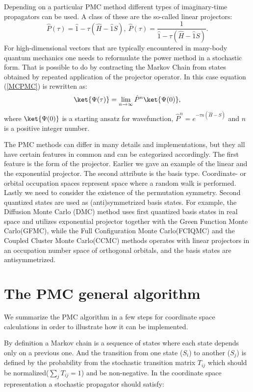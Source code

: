 \documentclass[twoside,english]{uiofysmaster}
\begin{document}
Depending on a particular PMC method different types of imaginary-time propagators can be used. A class of these  are the so-called linear projectors:
\[
\hat{P}(\tau)= \hat{1} - \tau (\hat{H} - \hat{1}S),\ 
\hat{P}(\tau)= \frac {1}{\hat{1} - \tau (\hat{H} - \hat{1}S)}.
\]
For high-dimensional vectors that are typically encountered in many-body quantum mechanics one needs to reformulate the power method in a stochastic form. That is possible to do by contracting the Markov Chain from states obtained by repeated application of the projector operator. In this case equation (\ref{MCPMC}) is rewritten as:
\begin{equation}\label{MCPMC1}
\ket{\Psi(\tau)}= \lim_{n\to\infty} \hat{P}^n \ket{\Psi(0)}, 
\end{equation}
where $\ket{\Psi(0)}$ is a starting ansatz for wavefunction, $\hat{P}^n = e^{-\tau n(\hat{H} - S)}$ and $n$ is a positive integer number.

The PMC methods can differ in many details and implementations, but
they all have certain features in common and can be categorized
accordingly. The first feature is the form of the projector. Earlier
we gave an example of the linear and the exponential projector. The
second attribute is the basis type. Coordinate- or orbital occupation
spaces represent space where a random walk is performed. Lastly we need
to consider the existence of the permutation symmetry. Second
quantized states are used as (anti)symmetrized basis states. For
example, the Diffusion Monte Carlo (DMC) method uses first quantized
basis states in real space and utilizes exponential projector together
with the Green Function Monte Carlo(GFMC), while the Full
Configuration Monte
Carlo(FCIQMC)\cite{BoothApproachingchemicalaccuracy2010}
\cite{BoothFermionMonteCarlo2009} and the Coupled Cluster Monte
Carlo(CCMC)\cite{SpencerDevelopmentsstochasticcoupled2016}
\cite{ThomStochasticCoupledCluster2010} methods operates with linear
projectors in an occupation number space of orthogonal orbitals, and
the basis states are antisymmetrized.

\section{The PMC general algorithm}
We summarize the PMC algorithm in a few steps for coordinate space calculations in order to illustrate how it can be implemented.

By definition a Markov chain is a sequence of states where each state
depends only on a previous one. And the transition from one
state ($S_i$) to another ($S_j$) is defined by the probability from
the stochastic transition matrix $T_{ij}$ which should be
normalized($\sum_jT_{ij}=1$) and be non-negative.  In the coordinate
space representation a stochastic propagator should satisfy:
\end{document}
